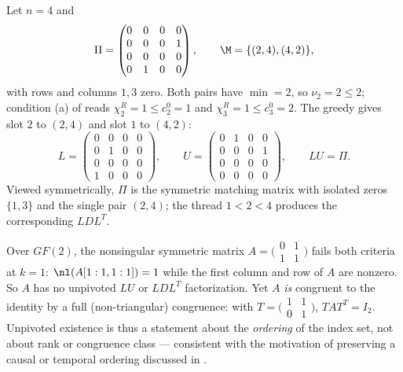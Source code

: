 \begin{example}\label{ex:crossing}
  Let $n = 4$ and
  \[
    \Pi =
    \begin{pmatrix}
      0 & 0 & 0 & 0\\
      0 & 0 & 0 & 1\\
      0 & 0 & 0 & 0\\
      0 & 1 & 0 & 0
    \end{pmatrix},
    \qquad
    \M = \{(2,4), (4,2)\},
  \]
  with rows and columns $1, 3$ zero.  Both pairs have $\min = 2$, so
  $\nu_2 = 2 \le 2$; condition (a) of  reads
  $\chi^R_2 = 1 \le c^0_2 = 1$ and $\chi^R_3 = 1 \le c^0_3 = 2$.  The
  greedy gives slot $2$ to $(2,4)$ and slot $1$ to $(4,2)$:
  \[
    L =
    \begin{pmatrix}
      0 & 0 & 0 & 0\\
      0 & 1 & 0 & 0\\
      0 & 0 & 0 & 0\\
      1 & 0 & 0 & 0
    \end{pmatrix},
    \qquad
    U =
    \begin{pmatrix}
      0 & 1 & 0 & 0\\
      0 & 0 & 0 & 1\\
      0 & 0 & 0 & 0\\
      0 & 0 & 0 & 0
    \end{pmatrix},
    \qquad
    LU = \Pi .
  \]
  Viewed symmetrically, $\Pi$ is the symmetric matching matrix with
  isolated zeros $\{1,3\}$ and the single pair $(2,4)$; the thread
  $1 < 2 < 4$ produces the corresponding $LDL^T$.
\end{example}

\begin{example}\label{ex:char2}
  Over $GF(2)$, the nonsingular symmetric matrix
  $A = \bigl(\begin{smallmatrix} 0 & 1\\ 1 & 1 \end{smallmatrix}\bigr)$
  fails both criteria at $k = 1$: $\nl(A[1:1,1:1]) = 1$ while the first
  column and row of $A$ are nonzero.  So $A$ has no unpivoted $LU$ or
  $LDL^T$ factorization.  Yet $A$ \emph{is} congruent to the identity by a
  full (non-triangular) congruence:
  with
  $T = \bigl(\begin{smallmatrix} 1 & 1\\ 0 & 1 \end{smallmatrix}\bigr)$,
  $T A T^T = I_2$.  Unpivoted existence is thus a statement about the
  \emph{ordering} of the index set, not about rank or congruence class ---
  consistent with the motivation of preserving a causal or temporal
  ordering discussed in .
\end{example}
